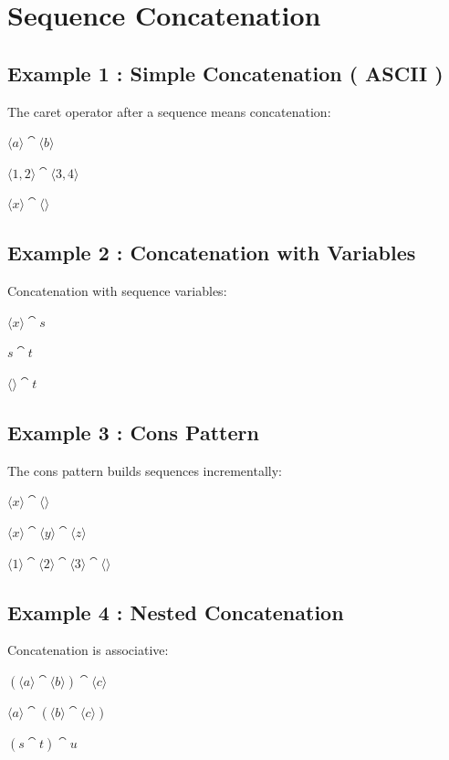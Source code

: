 \documentclass[a4paper,10pt,fleqn]{article}
\begin{document}
\section*{Sequence Concatenation}

\subsection*{Example 1 : Simple Concatenation ( ASCII )}

\noindent The caret operator after a sequence means concatenation:

\bigskip

\noindent
$\langle a \rangle \cat \langle b \rangle$


\noindent
$\langle 1, 2 \rangle \cat \langle 3, 4 \rangle$


\noindent
$\langle x \rangle \cat \langle \rangle$


\subsection*{Example 2 : Concatenation with Variables}

\noindent Concatenation with sequence variables:

\bigskip

\noindent
$\langle x \rangle \cat s$


\noindent
$s \cat t$


\noindent
$\langle \rangle \cat t$


\subsection*{Example 3 : Cons Pattern}

\noindent The cons pattern builds sequences incrementally:

\bigskip

\noindent
$\langle x \rangle \cat \langle \rangle$


\noindent
$\langle x \rangle \cat \langle y \rangle \cat \langle z \rangle$


\noindent
$\langle 1 \rangle \cat \langle 2 \rangle \cat \langle 3 \rangle \cat \langle \rangle$


\subsection*{Example 4 : Nested Concatenation}

\noindent Concatenation is associative:

\bigskip

\noindent
$(\langle a \rangle \cat \langle b \rangle) \cat \langle c \rangle$


\noindent
$\langle a \rangle \cat (\langle b \rangle \cat \langle c \rangle)$


\noindent
$(s \cat t) \cat u$
\end{document}
